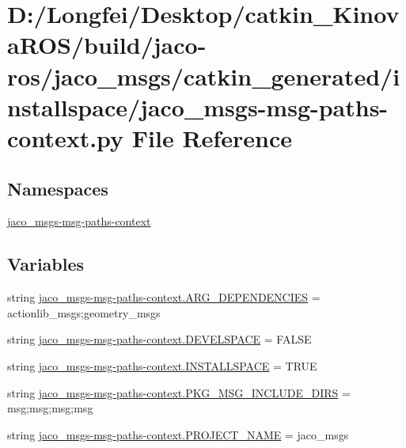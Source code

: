 \hypertarget{installspace_2jaco__msgs-msg-paths-context_8py}{}\section{D\+:/\+Longfei/\+Desktop/catkin\+\_\+\+Kinova\+R\+O\+S/build/jaco-\/ros/jaco\+\_\+msgs/catkin\+\_\+generated/installspace/jaco\+\_\+msgs-\/msg-\/paths-\/context.py File Reference}
\label{installspace_2jaco__msgs-msg-paths-context_8py}
\subsection*{Namespaces}
\begin{DoxyCompactItemize}
\item 
 \hyperlink{namespacejaco__msgs-msg-paths-context}{jaco\+\_\+msgs-\/msg-\/paths-\/context}
\end{DoxyCompactItemize}
\subsection*{Variables}
\begin{DoxyCompactItemize}
\item 
string \hyperlink{namespacejaco__msgs-msg-paths-context_ac3895b5ef2c57e7c5bbab6bc600b5b98}{jaco\+\_\+msgs-\/msg-\/paths-\/context.\+A\+R\+G\+\_\+\+D\+E\+P\+E\+N\+D\+E\+N\+C\+I\+ES} = \textquotesingle{}actionlib\+\_\+msgs;geometry\+\_\+msgs\textquotesingle{}
\item 
string \hyperlink{namespacejaco__msgs-msg-paths-context_adffb8432fbac7333d3bc5236b5cc1af1}{jaco\+\_\+msgs-\/msg-\/paths-\/context.\+D\+E\+V\+E\+L\+S\+P\+A\+CE} = \textquotesingle{}F\+A\+L\+SE\textquotesingle{}
\item 
string \hyperlink{namespacejaco__msgs-msg-paths-context_aa9c588ac9faf9483a91cb495a8be5af4}{jaco\+\_\+msgs-\/msg-\/paths-\/context.\+I\+N\+S\+T\+A\+L\+L\+S\+P\+A\+CE} = \textquotesingle{}T\+R\+UE\textquotesingle{}
\item 
string \hyperlink{namespacejaco__msgs-msg-paths-context_a615c13a91bdf0d70e95ff767b9bb1f66}{jaco\+\_\+msgs-\/msg-\/paths-\/context.\+P\+K\+G\+\_\+\+M\+S\+G\+\_\+\+I\+N\+C\+L\+U\+D\+E\+\_\+\+D\+I\+RS} = \textquotesingle{}msg;msg;msg;msg\textquotesingle{}
\item 
string \hyperlink{namespacejaco__msgs-msg-paths-context_a07c6ad829df8f3bb3913008e8a58a711}{jaco\+\_\+msgs-\/msg-\/paths-\/context.\+P\+R\+O\+J\+E\+C\+T\+\_\+\+N\+A\+ME} = \textquotesingle{}jaco\+\_\+msgs\textquotesingle{}
\end{DoxyCompactItemize}
